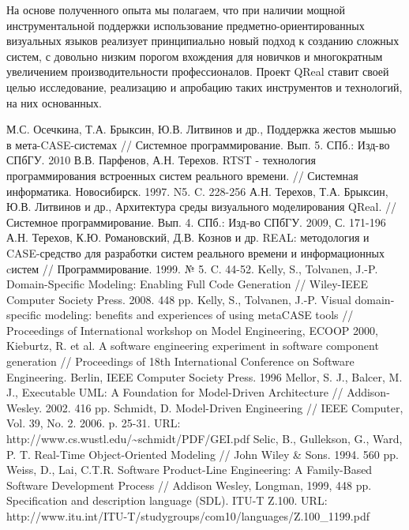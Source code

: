 \documentclass[a4paper]{article}
\begin{document}
На основе полученного опыта мы полагаем, что при наличии мощной инструментальной поддержки использование предметно-ориентированных визуальных языков реализует принципиально новый подход к созданию сложных систем, с довольно низким порогом вхождения для новичков и многократным увеличением производительности профессионалов. Проект QReal ставит своей целью исследование, реализацию и апробацию таких инструментов и технологий, на них основанных.

\begin{thebibliography}{9001}
   М.С. Осечкина, Т.А. Брыксин, Ю.В. Литвинов и др., Поддержка жестов мышью в мета-CASE-системах  // Системное программирование. Вып. 5. СПб.: Изд-во СПбГУ. 2010
   В.В. Парфенов, А.Н. Терехов. RTST - технология программирования встроенных систем реального времени. // Системная информатика. Новосибирск. 1997. N5. C. 228-256
   А.Н. Терехов, Т.А. Брыксин, Ю.В. Литвинов и др., Архитектура среды визуального моделирования QReal. // Системное программирование. Вып. 4. СПб.: Изд-во СПбГУ. 2009, С. 171-196
   А.Н. Терехов, К.Ю. Романовский, Д.В. Кознов и др. REAL: методология и CASE-средство для разработки систем реального времени и информационных cистем // Программирование. 1999. № 5. C. 44-52.
   Kelly, S., Tolvanen, J.-P. Domain-Specific Modeling: Enabling Full Code Generation // Wiley-IEEE Computer Society Press. 2008. 448 pp.
   Kelly, S., Tolvanen, J.-P. Visual domain-specific modeling: benefits and experiences of using metaCASE tools // Proceedings of International workshop on Model Engineering, ECOOP 2000, 
   Kieburtz, R. et al. A software engineering experiment in software component generation // Proceedings of 18th International Conference on Software Engineering. Berlin, IEEE Computer Society Press. 1996
   Mellor, S. J., Balcer, M. J., Executable UML: A Foundation for Model-Driven Architecture // Addison-Wesley. 2002. 416 pp.
   Schmidt, D. Model-Driven Engineering // IEEE Computer, Vol. 39, No. 2. 2006. p. 25-31. URL: http://www.cs.wustl.edu/\textasciitilde schmidt/PDF/GEI.pdf
   Selic, B., Gullekson, G., Ward, P. T. Real-Time Object-Oriented Modeling // John Wiley \& Sons. 1994. 560 pp.
   Weiss, D., Lai, C.T.R. Software Product-Line Engineering: A Family-Based Software Development Process // Addison Wesley, Longman, 1999, 448 pp.	
   Specification and description language (SDL). ITU-T Z.100. URL: http://www.itu.int/ITU-T/studygroups/com10/languages/Z.100\_1199.pdf

\end{thebibliography}
\end{document}
